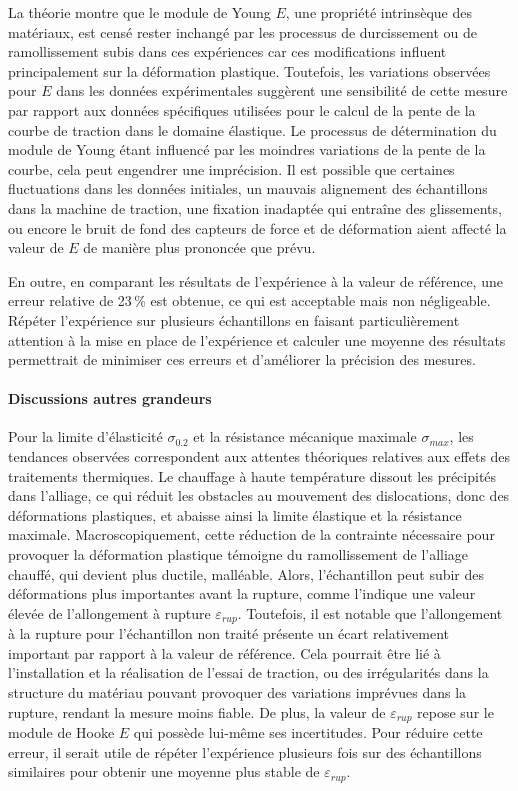 \documentclass[a4paper, 12pt,oneside]{article}
\begin{document}
La théorie montre que le module de Young $E$, une propriété intrinsèque des matériaux, est censé rester inchangé par les processus de durcissement ou de ramollissement subis dans ces expériences car ces modifications influent principalement sur la déformation plastique. Toutefois, les variations observées pour $E$ dans les données expérimentales suggèrent une sensibilité de cette mesure par rapport aux données spécifiques utilisées pour le calcul de la pente de la courbe de traction dans le domaine élastique. Le processus de détermination du module de Young étant influencé par les moindres variations de la pente de la courbe, cela peut engendrer une imprécision. Il est possible que certaines fluctuations dans les données initiales, un mauvais alignement des échantillons dans la machine de traction, une fixation inadaptée qui entraîne des glissements, ou encore le bruit de fond des capteurs de force et de déformation aient affecté la valeur de $E$ de manière plus prononcée que prévu.

En outre, en comparant les résultats de l'expérience à la valeur de référence, une erreur relative de 23\,\% est obtenue, ce qui est acceptable mais non négligeable. Répéter l'expérience sur plusieurs échantillons en faisant particulièrement attention à la mise en place de l'expérience et calculer une moyenne des résultats permettrait de minimiser ces erreurs et d'améliorer la précision des mesures. 

\vspace{-0.2cm}
\paragraph{Discussions autres grandeurs}

Pour la limite d’élasticité $\sigma_{0.2}$ et la résistance mécanique maximale $\sigma_{max}$, les tendances observées correspondent aux attentes théoriques relatives aux effets des traitements thermiques. Le chauffage à haute température dissout les précipités dans l’alliage, ce qui réduit les obstacles au mouvement des dislocations, donc des déformations plastiques, et abaisse ainsi la limite élastique et la résistance maximale. Macroscopiquement, cette réduction de la contrainte nécessaire pour provoquer la déformation plastique témoigne du ramollissement de l’alliage chauffé, qui devient plus ductile, malléable. Alors, l’échantillon peut subir des déformations plus importantes avant la rupture, comme l’indique une valeur élevée de l’allongement à rupture $\varepsilon_{rup}$. 
Toutefois, il est notable que l’allongement à la rupture pour l'échantillon non traité présente un écart relativement important par rapport à la valeur de référence. Cela pourrait être lié à l'installation et la réalisation de l'essai de traction, ou des irrégularités dans la structure du matériau pouvant provoquer des variations imprévues dans la rupture, rendant la mesure moins fiable. De plus, la valeur de $\varepsilon_{rup}$ repose sur le module de Hooke $E$ qui possède lui-même ses incertitudes. Pour réduire cette erreur, il serait utile de répéter l'expérience plusieurs fois sur des échantillons similaires pour obtenir une moyenne plus stable de $\varepsilon_{rup}$.
\end{document}
